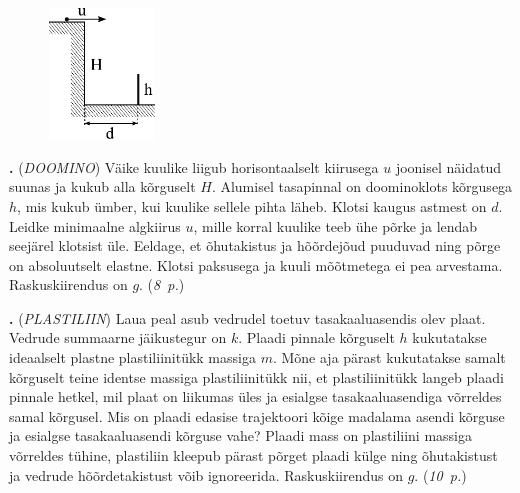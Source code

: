 \documentclass[11pt,a5paper]{article}
\newcommand{\numb}[1]{\vspace{5pt}\textbf{\large #1}}
\newcommand{\nimi}[1]{(\textsl{\small #1})}
\newcommand{\punktid}[1]{(\emph{#1~p.})}
\newcounter{ylesanne}
\newcommand{\yl}[1]{\addtocounter{ylesanne}{1}\numb{\theylesanne.} \nimi{#1} \newblock{}}
\newcommand{\autor}[1]{}%
\begin{document}
\begin{figure}
  \vspace{-2em}
  \begin{center}
    \includegraphics[width=2.8cm]{pall}
  \end{center}
  \vspace{-2em}
\end{figure}
\yl{DOOMINO}
Väike kuulike liigub horisontaalselt kiirusega $u$ joonisel näidatud suunas ja kukub alla kõrguselt $H$. Alumisel tasapinnal on doominoklots kõrgusega $h$, mis kukub ümber, kui kuulike sellele pihta läheb. Klotsi kaugus astmest on $d$. Leidke minimaalne algkiirus $u$, mille korral kuulike teeb ühe põrke ja lendab seejärel klotsist üle. Eeldage, et õhutakistus ja hõõrdejõud puuduvad ning põrge on absoluutselt elastne. Klotsi paksusega ja kuuli mõõtmetega ei pea arvestama. Raskuskiirendus on $g$.
\punktid{8} \autor{Päivo Simson}

\yl{PLASTILIIN}
Laua peal asub vedrudel toetuv tasakaaluasendis olev plaat. Vedrude summaarne jäikustegur on $k$. Plaadi pinnale kõrguselt $h$ kukutatakse ideaalselt plastne plastiliinitükk massiga $m$. Mõne aja pärast kukutatakse samalt kõrguselt teine identse massiga plastiliinitükk nii, et plastiliinitükk langeb plaadi pinnale hetkel, mil plaat on liikumas üles ja esialgse tasakaaluasendiga võrreldes samal kõrgusel. Mis on plaadi edasise trajektoori kõige madalama asendi kõrguse ja esialgse tasakaaluasendi kõrguse vahe? Plaadi mass on plastiliini massiga võrreldes tühine, plastiliin kleepub pärast põrget plaadi külge ning õhutakistust ja vedrude hõõrdetakistust võib ignoreerida. Raskuskiirendus on $g$.
\punktid{10} \autor{Taavet Kalda}
\end{document}
